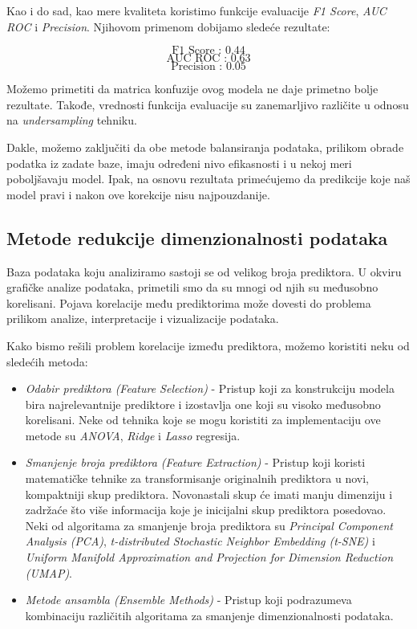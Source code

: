 \documentclass[12pt]{article}
\theoremstyle{definition}
\theoremstyle{remark}
\begin{document}
Kao i do sad, kao mere kvaliteta koristimo funkcije evaluacije \emph{F1 Score}, \emph{AUC ROC} i \emph{Precision}. Njihovom primenom dobijamo sledeće rezultate:

\hfill

$$
\text{F1 Score : 0.44}
$$
$$
\text{AUC ROC : 0.63}
$$
$$
\text{Precision : 0.05}
$$
\hfill

Možemo primetiti da matrica konfuzije ovog modela ne daje primetno bolje rezultate. Takođe, vrednosti funkcija evaluacije su zanemarljivo različite u odnosu na \emph{undersampling} tehniku. 

Dakle, možemo zaključiti da obe metode balansiranja podataka, prilikom obrade podatka iz zadate baze, imaju određeni nivo efikasnosti i u nekoj meri poboljšavaju model. Ipak, na osnovu rezultata primećujemo da predikcije koje naš model pravi i nakon ove korekcije nisu najpouzdanije.

\newpage
\subsection{Metode redukcije dimenzionalnosti podataka}

Baza podataka koju analiziramo sastoji se od velikog broja prediktora. U okviru grafičke analize podataka, primetili smo da su mnogi od njih su međusobno korelisani. Pojava korelacije među prediktorima može dovesti do problema prilikom analize, interpretacije i vizualizacije podataka. 

Kako bismo rešili problem korelacije između prediktora, možemo koristiti neku od sledećih metoda:

\begin{itemize}

\item \emph{Odabir prediktora (Feature Selection)} - Pristup koji za konstrukciju modela bira najrelevantnije prediktore i izostavlja one koji su visoko međusobno korelisani. Neke od tehnika koje se mogu koristiti za implementaciju ove metode su \emph{ANOVA}, \emph {Ridge} i \emph {Lasso} regresija.

\item \emph{ Smanjenje broja prediktora (Feature Extraction)} - Pristup koji koristi matematičke tehnike za transformisanje originalnih prediktora u novi, kompaktniji skup prediktora. Novonastali skup će imati manju dimenziju i zadržaće što više informacija koje je inicijalni skup prediktora posedovao. Neki od algoritama za smanjenje broja prediktora su \emph{Principal Component Analysis (PCA)}, \emph{t-distributed Stochastic Neighbor Embedding (t-SNE)} i  \emph{Uniform Manifold Approximation and Projection for Dimension Reduction (UMAP)}.

\item  \emph{ Metode ansambla (Ensemble Methods)} - Pristup koji podrazumeva kombinaciju različitih algoritama za smanjenje dimenzionalnosti podataka.


\end{itemize}
\end{document}
